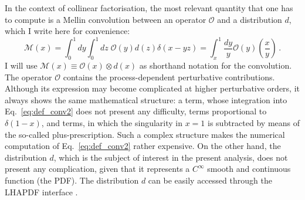 In the context of collinear factorisation, the most relevant quantity that one has to compute is a Mellin convolution between an operator $\mathcal{O}$ and a distribution $d$, which I write here for convenience:
\begin{equation}
  \mathcal{M}(x) = \int_{0}^{1} dy \int_{0}^{1} dz \; \mathcal{O}(y) d(z) \delta(x-yz) = \int_{x}^{1} \frac{dy}{y} \mathcal{O}(y) \left( \frac{x}{y} \right)\,.
  \label{eq:def_conv2}
\end{equation}
I will use $\mathcal{M}(x) \equiv \mathcal{O}(x) \otimes d(x)$ as shorthand notation for the convolution. The operator $\mathcal{O}$ contains the process-dependent perturbative contributions. Although its expression may become complicated at higher perturbative orders, it always shows the same mathematical structure: a  term, whose integration into Eq.~\eqref{eq:def_conv2} does not present any difficulty,  terms proportional to $\delta(1-x)$, and  terms, in which the singularity in $x=1$ is subtracted by means of the so-called plus-prescription. Such a complex structure makes the numerical computation of Eq.~\eqref{eq:def_conv2} rather expensive. On the other hand, the distribution $d$, which is the subject of interest in the present analysis, does not present any complication, given that it represents a $C^{\infty}$ smooth and continuous function (the PDF). The distribution $d$ can be easily accessed through the LHAPDF interface \cite{Buckley:2014ana}.%

